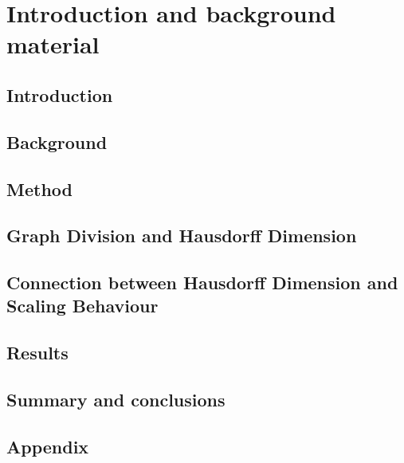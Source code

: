 \documentclass[nocoverpage,swedish,g5paper]{thesis}
\begin{document}
\begin{preface}

\end{preface}

\tableofcontents

\mainmatter

\part{Introduction and background material}

\chapter{Introduction}


\chapter{Background}\label{ch:Background}


\chapter{Method}\label{ch:Method}


\chapter{Graph Division and Hausdorff Dimension}\label{ch:GraphDivisionandHausdorffDim}


\chapter{Connection between Hausdorff Dimension and Scaling Behaviour}\label{ch:HausdorffScaling}


\chapter{Results}\label{ch:Results}


\chapter{Summary and conclusions}\label{ch:Summary}


\chapter{Appendix}\label{ch:appendix}



%



\end{document}
